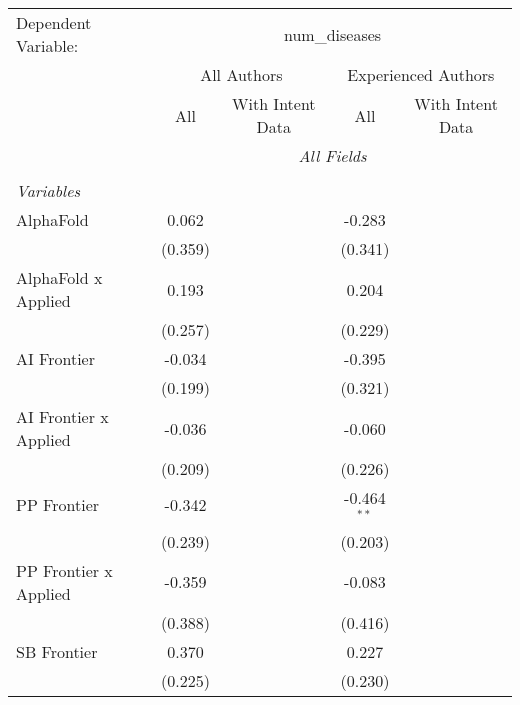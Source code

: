 \begingroup
\centering
\begin{tabular}{lcccccc}
   \tabularnewline \midrule \midrule
   Dependent Variable: & \multicolumn{6}{c}{num\_diseases}\\
 & \multicolumn{3}{c}{All Authors} & \multicolumn{3}{c}{Experienced Authors} \\
\cmidrule(lr){2-4} \cmidrule(lr){5-7}
 & \multicolumn{1}{c}{All} & \multicolumn{2}{c}{With Intent Data} & \multicolumn{1}{c}{All} & \multicolumn{2}{c}{With Intent Data} \\
\cmidrule(lr){2-2} \cmidrule(lr){3-4} \cmidrule(lr){5-5} \cmidrule(lr){6-7}
 & \multicolumn{6}{c}{\textit{All Fields}} \\ \\
   \emph{Variables}\\
   AlphaFold             & 0.062    &         &         & -0.283        &        &   \\   
                         & (0.359)  &         &         & (0.341)       &        &   \\   
   AlphaFold x Applied   & 0.193    &         &         & 0.204         &        &   \\   
                         & (0.257)  &         &         & (0.229)       &        &   \\   
   AI Frontier           & -0.034   &         &         & -0.395        &        &   \\   
                         & (0.199)  &         &         & (0.321)       &        &   \\   
   AI Frontier x Applied & -0.036   &         &         & -0.060        &        &   \\   
                         & (0.209)  &         &         & (0.226)       &        &   \\   
   PP Frontier           & -0.342   &         &         & -0.464$^{**}$ &        &   \\   
                         & (0.239)  &         &         & (0.203)       &        &   \\   
   PP Frontier x Applied & -0.359   &         &         & -0.083        &        &   \\   
                         & (0.388)  &         &         & (0.416)       &        &   \\   
   SB Frontier           & 0.370    &         &         & 0.227         &        &   \\   
                         & (0.225)  &         &         & (0.230)       &        &   \\   

\end{tabular}
